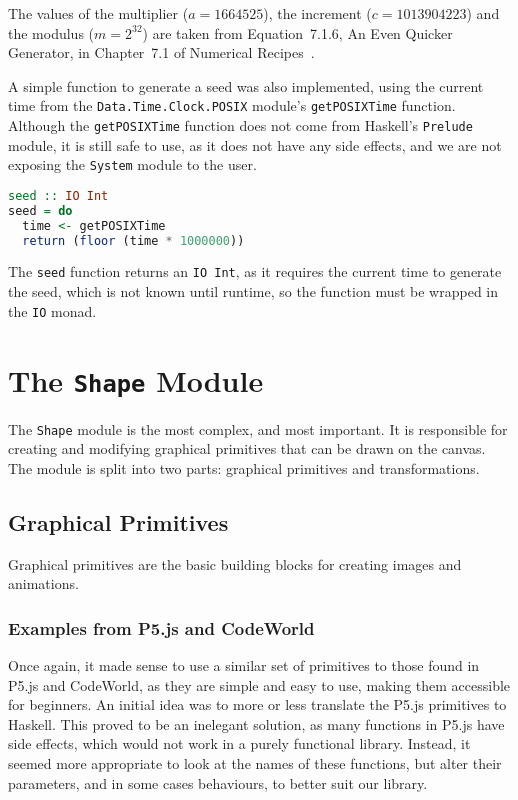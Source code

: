 \documentclass[../main.tex]{subfiles}
\begin{document}
            The values of the multiplier ($a=1664525$), the increment ($c=1013904223$) and
                the modulus ($m=2^{32}$) are taken from Equation~7.1.6, An Even Quicker
                Generator, in Chapter~7.1 of Numerical Recipes~\citep{numericalRecipes}.

            A simple function to generate a seed was also implemented, using the current
                time from the \texttt{Data.Time.Clock.POSIX} module's \texttt{getPOSIXTime}
                function.
            Although the \texttt{getPOSIXTime} function does not come from Haskell's
                \texttt{Prelude} module, it is still safe to use, as it does not have any side
                effects, and we are not exposing the \texttt{System} module to the user.

            \begin{lstlisting}[language={Haskell}, label={lst:seed}, caption={The \texttt{seed} 
                function.}]
seed :: IO Int
seed = do
  time <- getPOSIXTime
  return (floor (time * 1000000))\end{lstlisting}

            The \texttt{seed} function returns an \texttt{IO Int}, as it requires the
                current time to generate the seed, which is not known until runtime, so the
                function must be wrapped in the \texttt{IO} monad.

    \section{The \texttt{Shape}
        Module} The \texttt{Shape} module is the most complex, and most important.
        It is responsible for creating and modifying graphical primitives that can be
            drawn on the canvas.
        The module is split into two parts: graphical primitives and transformations.

        \subsection{Graphical Primitives}
            Graphical primitives are the basic building blocks for creating images and
                animations.

            \subsubsection{Examples from P5.js and CodeWorld}
                Once again, it made sense to use a similar set of primitives to those found in
                    P5.js and CodeWorld, as they are simple and easy to use, making them accessible
                    for beginners.
                An initial idea was to more or less translate the P5.js primitives to Haskell.
                This proved to be an inelegant solution, as many functions in P5.js have side
                    effects, which would not work in a purely functional library.
                Instead, it seemed more appropriate to look at the names of these functions,
                    but alter their parameters, and in some cases behaviours, to better suit our
                    library.
\end{document}

